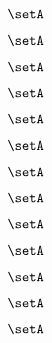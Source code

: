 \begin{forslides}
    \begin{equation}
        \label{eq:slides-processes-83}
        \setA
    \end{equation}

    \begin{equation}
        \label{eq:slides-processes-84}
        \setA
    \end{equation}

    \begin{equation}
        \label{eq:slides-processes-85}
        \setA
    \end{equation}

    \begin{equation}
        \label{eq:slides-processes-86}
        \setA
    \end{equation}

    \begin{equation}
        \label{eq:slides-processes-87}
        \setA
    \end{equation}

    \begin{equation}
        \label{eq:slides-processes-88}
        \setA
    \end{equation}

    \begin{equation}
        \label{eq:slides-processes-89}
        \setA
    \end{equation}
    
    \begin{equation}
        \label{eq:slides-processes-90}
        \setA
    \end{equation}

    \begin{equation}
        \label{eq:slides-processes-91}
        \setA
    \end{equation}

    \begin{equation}
        \label{eq:slides-processes-92}
        \setA
    \end{equation}

    \begin{equation}
        \label{eq:slides-processes-93}
        \setA
    \end{equation}

    \begin{equation}
        \label{eq:slides-processes-94}
        \setA
    \end{equation}

    \begin{equation}
        \label{eq:slides-processes-95}
        \setA
    \end{equation}


\end{forslides}

